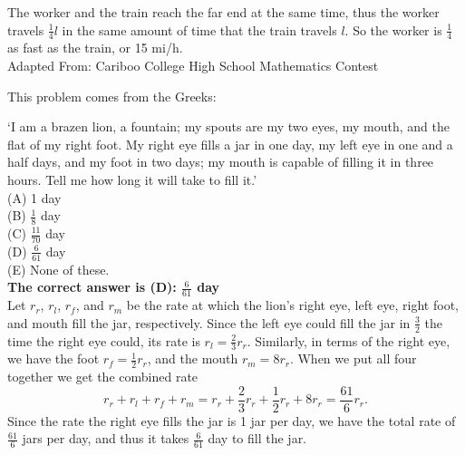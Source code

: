 \documentclass{article}
\begin{document}
The worker and the train reach the far end at the same time, thus the worker travels $\frac{1}{4}l$ in the same amount of time that the train travels $l$. So the worker is $\frac{1}{4}$ as fast as the train, or 15 mi/h.
\\[5 ex]

\scriptsize
Adapted From: Cariboo College High School Mathematics Contest

\normalsize
This problem comes from the Greeks:

`I am a brazen lion, a fountain; my spouts are my two eyes, my mouth, and the flat of my right foot. My right eye fills a jar in one day, my left eye in one and a half days, and my foot in two days; my mouth is capable of filling it in three hours. Tell me how long it will take to fill it.'\\
(A) 1 day\\
(B) $\frac{1}{8}$ day\\
(C) $\frac{11}{70}$ day\\
(D) $\frac{6}{61}$ day\\
(E) None of these.\\


\textbf{The correct answer is (D): $\frac{6}{61}$ day}\\[1 ex]
Let $r_{r}$, $r_{l}$, $r_{f}$, and $r_{m}$ be the rate at which the lion's right eye, left eye, right foot, and mouth fill the jar, respectively. Since the left eye could fill the jar in $\frac{3}{2}$ the time the right eye could, its rate is $r_{l}=\frac{2}{3}r_{r}$. Similarly, in terms of the right eye, we have the foot $r_{f}=\frac{1}{2}r_{r}$, and the mouth $r_{m}=8r_{r}$.  When we put all four together we get the combined rate
\begin{equation*}
r_{r}+r_{l}+r_{f}+r_{m}=r_{r}+\frac{2}{3}r_{r}+\frac{1}{2}r_{r}+8r_{r}=\frac{61}{6}r_r.
\end{equation*}
Since the rate the right eye fills the jar is 1 jar per day, we have the total rate of $\frac{61}{6}$ jars per day, and thus it takes $\frac{6}{61}$ day to fill the jar.
\\[5 ex]
\end{document}
